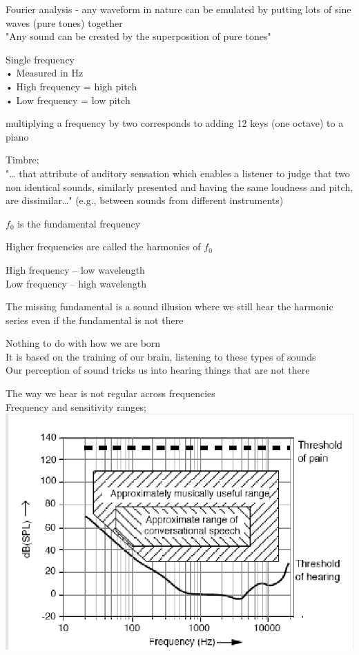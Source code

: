 \documentclass[]{project_plan}
\begin{document}
Fourier analysis - any waveform in nature can be emulated by putting lots of sine waves (pure tones) together\\
"Any sound can be created by the superposition of pure tones"

Single frequency\\
• Measured in Hz\\
• High frequency = high pitch\\
• Low frequency = low pitch

multiplying a frequency by two corresponds to adding 12 keys (one octave) to a piano

Timbre;\\
"… that attribute of auditory sensation which
enables a listener to judge that two non
identical sounds, similarly presented and
having the same loudness and pitch, are
dissimilar…" (e.g., between sounds from different instruments)

$f_0$ is the fundamental frequency

Higher frequencies are called the harmonics of $f_0$

High frequency – low wavelength\\
Low frequency – high wavelength

The missing fundamental is a sound illusion where we still hear the harmonic
series even if the fundamental is not there

Nothing to do with how we are born\\
It is based on the training of our brain, listening to these types of sounds\\
Our perception of sound tricks us into hearing things that are not there

\newpage

The way we hear is not regular across frequencies\\
Frequency and sensitivity ranges;\\
\includegraphics[width=\linewidth]{frequency_and_hearing_ranges.png}
\end{document}
